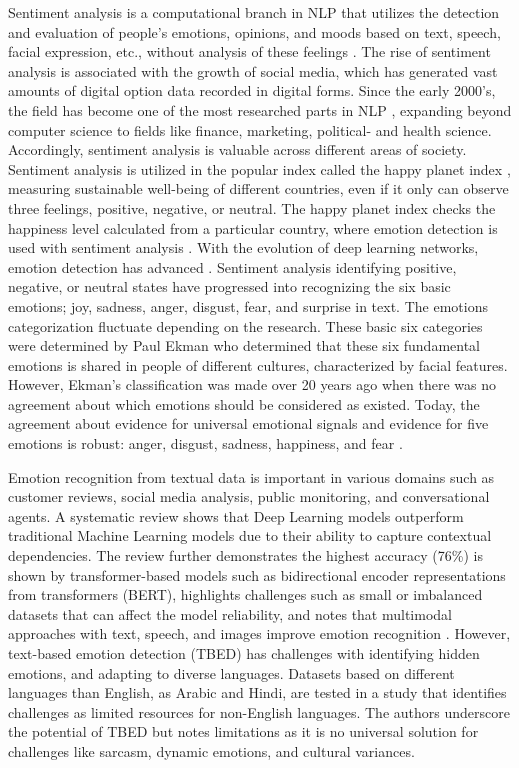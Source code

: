 Sentiment analysis is a computational branch in NLP that utilizes the detection and evaluation of people’s emotions, opinions, and moods based on text, speech, facial expression, etc., without analysis of these feelings \autocite{Ermakova2023}. The rise of sentiment analysis is associated with the growth of social media, which has generated vast amounts of digital option data recorded in digital forms. Since the early 2000’s, the field has become one of the most researched parts in NLP \autocite{Zhang2018}, expanding beyond computer science to fields like finance, marketing, political- and health science. Accordingly, sentiment analysis is valuable across different areas of society. Sentiment analysis is utilized in the popular index called the happy planet index \autocite{HappyPlanetIndex}, measuring sustainable well-being of different countries, even if it only can observe three feelings, positive, negative, or neutral. The happy planet index checks the happiness level calculated from a particular country, where emotion detection is used with sentiment analysis \autocite{Madhuri2021}.
With the evolution of deep learning networks, emotion detection has advanced \autocite{Safari2023}. Sentiment analysis identifying positive, negative, or neutral states have progressed into recognizing the six basic emotions; joy, sadness, anger, disgust, fear, and surprise in text. The emotions categorization fluctuate depending on the research. These basic six categories were determined by Paul Ekman \autocite{Oatley2019, Kusal2023} who determined that these six fundamental emotions is shared in people of different cultures, characterized by facial features. However, Ekman’s classification was made over 20 years ago when there was no agreement about which emotions should be considered as existed. Today, the agreement about evidence for universal emotional signals and evidence for five emotions is robust: anger, disgust, sadness, happiness, and fear \autocite{Ekman2016}.

Emotion recognition from textual data is important in various domains such as customer reviews, social media analysis, public monitoring, and conversational agents. A systematic review \autocite{Kusal2023} shows that Deep Learning models outperform traditional Machine Learning models due to their ability to capture contextual dependencies. The review further demonstrates the highest accuracy (76\%) is shown by transformer-based models such as bidirectional encoder representations from transformers (BERT), highlights challenges such as small or imbalanced datasets that can affect the model reliability, and notes that multimodal approaches with text, speech, and images improve emotion recognition \autocite{Madhuri2021}. However, text-based emotion detection (TBED) has challenges with identifying hidden emotions, and adapting to diverse languages. Datasets based on different languages than English, as Arabic and Hindi, are tested in a study \autocite{Maruf2024} that identifies challenges as limited resources for non-English languages. The authors underscore the potential of TBED but notes limitations as it is no universal solution for challenges like sarcasm, dynamic emotions, and cultural variances.

